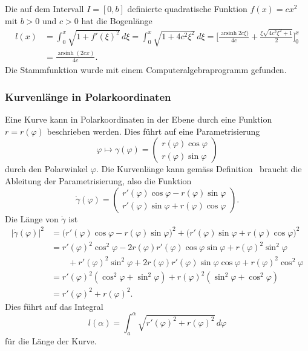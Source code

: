 \begin{beispiel}
Die auf dem Intervall $I=[0,b]$ definierte quadratische Funktion $f(x)=cx^2$
mit $b>0$ und $c>0$ hat die Bogenlänge
\begin{align*}
l(x)
&=
\int_0^x \sqrt{1+f'(\xi)^2}\,d\xi
=
\int_0^x \sqrt{1+4c^2\xi^2}\,d\xi
=
\biggl[
\frac{ \operatorname{arsinh}2c\xi)}{4c} + \frac{\xi\sqrt{4c^2\xi^2+1}}{2}
\biggr]_0^x
\\
&=
\frac{ \operatorname{arsinh}(2cx)}{4c}.
\end{align*}
Die Stammfunktion wurde mit einem Computeralgebraprogramm gefunden.
\end{beispiel}

\subsubsection{Kurvenlänge in Polarkoordinaten}
Eine Kurve kann in Polarkoordinaten in der Ebene durch eine Funktion
$r=r(\varphi)$ beschrieben werden.
Dies führt auf eine Parametrisierung
\[
\varphi \mapsto \gamma(\varphi)=\begin{pmatrix}
r(\varphi)\cos\varphi\\
r(\varphi)\sin\varphi
\end{pmatrix}
\]
durch den Polarwinkel $\varphi$.
Die Kurvenlänge kann gemäss 
Definition~\label{buch:geometrie:def:kurvenlaenge} braucht
die Ableitung der Parametrisierung, also die Funktion
\[
\dot{\gamma}(\varphi)
=
\begin{pmatrix}
r'(\varphi)\cos\varphi - r(\varphi)\sin\varphi\\
r'(\varphi)\sin\varphi + r(\varphi)\cos\varphi
\end{pmatrix}.
\]
Die Länge von $\dot{\gamma}$ ist
\begin{align*}
|\dot{\gamma}(\varphi)|^2
&=
\bigl(
r'(\varphi)\cos\varphi - r(\varphi)\sin\varphi
\bigr)^2
+
\bigl(
r'(\varphi)\sin\varphi + r(\varphi)\cos\varphi
\bigr)^2
\\
&=
r'(\varphi)^2\cos^2\varphi
-2r(\varphi)r'(\varphi)\cos\varphi\sin\varphi
+r(\varphi)^2\sin^2\varphi
\\
&\qquad
+r'(\varphi)^2\sin^2\varphi
+2r(\varphi)r'(\varphi)\sin\varphi\cos\varphi
+r(\varphi)^2\cos^2\varphi
\\
&=r'(\varphi)^2(\cos^2\varphi+\sin^2\varphi)
+ r(\varphi)^2(\sin^2\varphi+\cos^2\varphi)
\\
&=
r'(\varphi)^2 + r(\varphi)^2.
\end{align*}
Dies führt auf das
Integral
\begin{equation}
l(\alpha)
=
\int_a^\alpha \sqrt{r'(\varphi)^2 + r(\varphi)^2}\,d\varphi
\end{equation}
für die Länge der Kurve.

